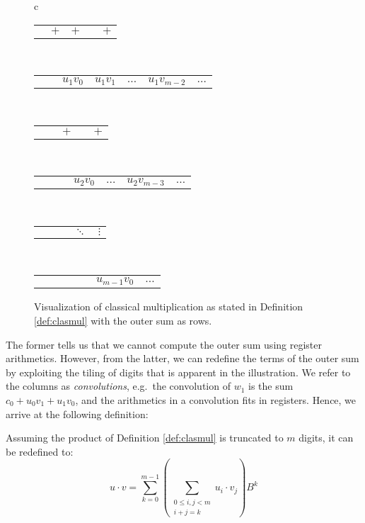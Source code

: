 \begin{figure}
\begin{tabular}{c}
    \begin{tabular}{C{0.8cm}C{0.8cm}C{0.8cm}C{0.5cm}C{0.8cm}}
       & $+$ & $+$ &  & $+$
    \end{tabular}\\[-0.5ex]
    \begin{tabular}{C{0cm}C{0.8cm}C{0.8cm}C{0.8cm}C{0.5cm}C{0.8cm}C{0cm}}
       & & $u_1v_0$ & $u_1v_1$ & $\ldots$ & $u_1v_{m-2}$ & $\ldots$
    \end{tabular}\\[-0.5ex]
    \begin{tabular}{C{0.8cm}C{0.8cm}C{0.8cm}C{0.5cm}C{0.8cm}}
       & & $+$ &  & $+$
    \end{tabular}\\[-0.5ex]
    \begin{tabular}{C{0cm}C{0.8cm}C{0.8cm}C{0.8cm}C{0.5cm}C{0.8cm}C{0cm}}
       & & & $u_2v_0$ & $\ldots$ & $u_2v_{m-3}$ & $\ldots$
    \end{tabular}\\[-0.6ex]
    \begin{tabular}{C{0.8cm}C{0.8cm}C{0.8cm}C{0.5cm}C{0.8cm}}
       & & & $\ddots$ & $\vdots$
    \end{tabular}\\[-0.6ex]
    \begin{tabular}{C{0cm}C{0.8cm}C{0.8cm}C{0.8cm}C{0.5cm}C{0.8cm}C{0cm}}
       & & & & & $u_{m-1}v_0$ & $\ldots$
    \end{tabular}
  \end{tabular}
  \caption{\footnotesize Visualization of classical multiplication as stated in Definition \ref{def:clasmul} with the outer sum as rows.}
  \label{fig:tiledmult}
\end{figure}

The former tells us that we cannot compute the outer sum using register
arithmetics. However, from the latter, we can redefine the terms of the outer
sum by exploiting the tiling of digits that is apparent in the illustration. We
refer to the columns as \textit{convolutions}, e.g.\ the convolution of $w_1$ is
the sum $c_0+u_0v_1+u_1v_0$, and the arithmetics in a convolution fits in
registers. Hence, we arrive at the following definition:

\begin{definition}\label{def:clasmultil}
  Assuming the product of Definition \ref{def:clasmul} is truncated to $m$
  digits, it can be redefined to:
\begin{equation}
\label{eq:clasmul}
u \cdot v = \sum_{k=0}^{m-1} \left( \sum_{\substack{0\leq i,j < m\\i+j=k}}u_i\cdot v_j \right)B^{k}
\end{equation}
\end{definition}

